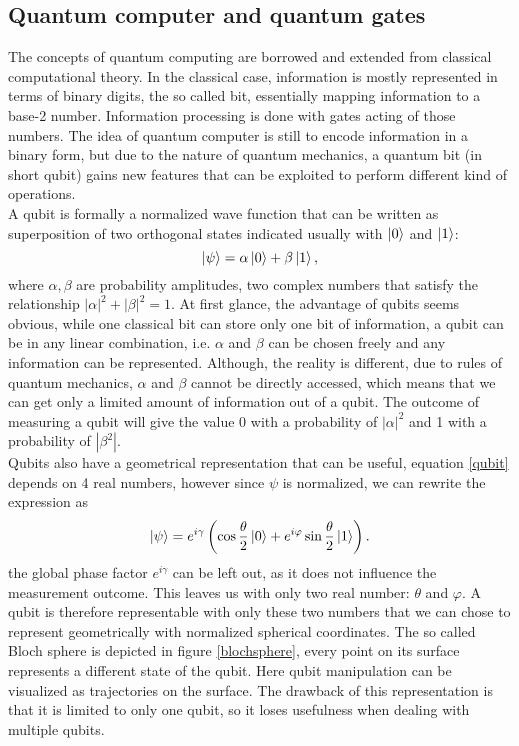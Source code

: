 \subsection{Quantum computer and quantum gates}
The concepts of quantum computing are borrowed and extended from classical computational theory. In the classical case, information is mostly represented in terms of binary digits, the so called bit, essentially mapping information to a base-2 number. Information processing is done with gates acting of those numbers. The idea of quantum computer is still to encode information in a binary form, but due to the nature of quantum mechanics, a quantum bit (in short qubit) gains new features that can be exploited to perform different kind of operations.\\
A qubit is formally a normalized wave function that can be written as superposition of two orthogonal states indicated usually with $\ket{0}$ and $\ket{1}$:
\begin{equation}
\label{qubit}
\ket{\psi} = \alpha \ket{0} + \beta\ket{1},
\end{equation}
where $\alpha,\beta$ are probability amplitudes, two complex numbers that satisfy the relationship $|\alpha|^2+|\beta|^2 = 1$.
At first glance, the advantage of qubits seems obvious, while one classical bit can store only one bit of information, a qubit can be in any linear combination, i.e. $\alpha$ and $\beta$ can be chosen freely and any information can be represented. Although, the reality is different, due to rules of quantum mechanics, $\alpha$ and $\beta$ cannot be directly accessed, which means that we can get only a limited amount of information out of a qubit. The outcome of measuring a qubit will give the value 0 with a probability of $|\alpha|^2$ and 1 with a probability of $|\beta^2|$.\\
Qubits also have a geometrical representation that can be useful, equation \eqref{qubit} depends on 4 real numbers, however since $\psi$ is normalized, we can rewrite the expression as
\begin{equation}
\ket{\psi} = e^{i\gamma}\left(\cos\frac{\theta}{2}\ket{0} + e^{i\varphi}\sin\frac{\theta}{2}\ket{1}\right).
\end{equation}
the global phase factor $e^{i\gamma}$ can be left out, as it does not influence the measurement outcome. This leaves us with only two real number: $\theta$ and $\varphi$. A qubit is therefore representable with only these two numbers that we can chose to represent geometrically with normalized spherical coordinates. The so called Bloch sphere is depicted in figure \ref{blochsphere}, every point on its surface represents a different state of the qubit. Here qubit manipulation can be visualized as trajectories on the surface. The drawback of this representation is that it is limited to only one qubit, so it loses usefulness when dealing with multiple qubits.
